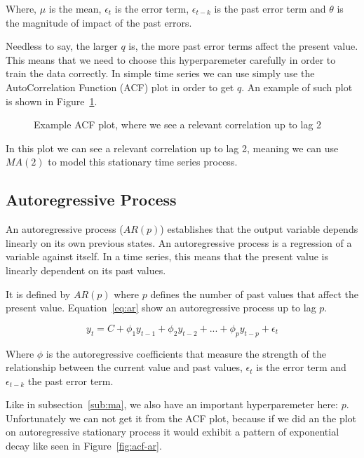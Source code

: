 \documentclass[journal]{IEEEtran}
\begin{document}
Where, $\mu$ is the mean, $\epsilon_t$ is the error term, $\epsilon_{t-k}$ is
the past error term and $\theta$ is the magnitude of impact of the past errors.

Needless to say, the larger $q$ is, the more past error terms affect the
present value. This means that we need to choose this hyperparemeter carefully
in order to train the data correctly. In simple time series we can use simply
use the AutoCorrelation Function (ACF) plot in  order to get $q$. An example
of such plot is shown in Figure~\ref{fig:acf}.

\begin{figure}[htbp]
  \centering
  
    \caption{Example ACF plot, where we see a relevant correlation up to lag 2}
  \label{fig:acf}
\end{figure}

In this plot we can see a relevant correlation up to lag 2, meaning we can use
$MA(2)$ to model this stationary time series process.

\subsection{Autoregressive Process}\label{sub:ar}

An autoregressive process ($AR(p)$) establishes that the output variable
depends linearly on its own previous states. An autoregressive process is a
regression of a variable against itself. In a time series, this means that the
present value is linearly dependent on its past values. \cite{timeseries}

It is defined by $AR(p)$ where $p$ defines the number of past
values that affect the present value. Equation~\ref{eq:ar} show an
autoregressive process up to lag $p$.

\begin{equation}
    y_t = C + \phi_1 y_{t-1} + \phi_2 y_{t-2} +
            ... +  \phi_p y_{t-p} + \epsilon_t
    \label{eq:ar}
\end{equation}

Where $\phi$ is the autoregressive coefficients that measure the strength of
the relationship between the current value and past values, $\epsilon_t$ is
the error term and $\epsilon_{t-k}$ the past error term.

Like in subsection~\ref{sub:ma}, we also have an important hyperparemeter
here: $p$. Unfortunately we can not get it from the ACF plot, because if we
did an the plot on autoregressive stationary process it would exhibit a
pattern of exponential decay\cite{timeseries} like seen in
Figure~\ref{fig:acf-ar}.
\end{document}
